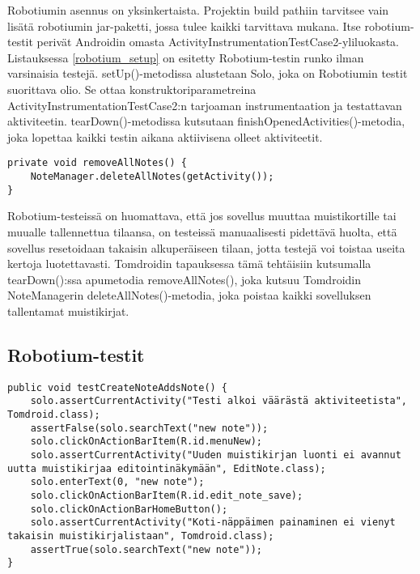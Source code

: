 Robotiumin asennus on yksinkertaista. Projektin build pathiin tarvitsee vain lisätä robotiumin jar-paketti, jossa tulee kaikki tarvittava mukana. Itse robotium-testit perivät Androidin omasta ActivityInstrumentationTestCase2-yliluokasta. Listauksessa \ref{robotium_setup} on esitetty Robotium-testin runko ilman varsinaisia testejä. setUp()-metodissa alustetaan Solo, joka on Robotiumin testit suorittava olio. Se ottaa konstruktoriparametreina ActivityInstrumentationTestCase2:n tarjoaman instrumentaation ja testattavan aktiviteetin. tearDown()-metodissa kutsutaan finishOpenedActivities()-metodia, joka lopettaa kaikki testin aikana aktiivisena olleet aktiviteetit.

\begin{lstlisting}[float,label=delete_notes,caption=Muistikirjojen poisto]
private void removeAllNotes() {
	NoteManager.deleteAllNotes(getActivity());
}
\end{lstlisting}

Robotium-testeissä on huomattava, että jos sovellus muuttaa muistikortille tai muualle tallennettua tilaansa, on testeissä manuaalisesti pidettävä huolta, että sovellus resetoidaan takaisin alkuperäiseen tilaan, jotta testejä voi toistaa useita kertoja luotettavasti. Tomdroidin tapauksessa tämä tehtäisiin kutsumalla tearDown():ssa apumetodia removeAllNotes(), joka kutsuu Tomdroidin NoteManagerin deleteAllNotes()-metodia, joka poistaa kaikki sovelluksen tallentamat muistikirjat.

\subsection{Robotium-testit}

\begin{lstlisting}[float,label=robotium_createnote,caption=Muistikirjan luontitesti robotiumilla]
public void testCreateNoteAddsNote() {
	solo.assertCurrentActivity("Testi alkoi väärästä aktiviteetista", Tomdroid.class);
	assertFalse(solo.searchText("new note"));
	solo.clickOnActionBarItem(R.id.menuNew);
	solo.assertCurrentActivity("Uuden muistikirjan luonti ei avannut uutta muistikirjaa editointinäkymään", EditNote.class);
	solo.enterText(0, "new note");
	solo.clickOnActionBarItem(R.id.edit_note_save);
	solo.clickOnActionBarHomeButton();
	solo.assertCurrentActivity("Koti-näppäimen painaminen ei vienyt takaisin muistikirjalistaan", Tomdroid.class);
	assertTrue(solo.searchText("new note"));
}
\end{lstlisting}


